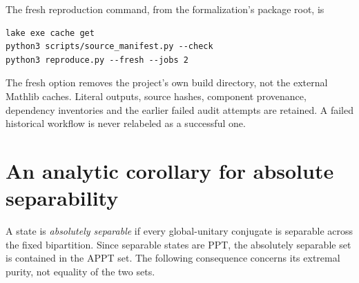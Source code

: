 \documentclass[11pt]{article}
\theoremstyle{remark}\newtheorem{remark}[theorem]{Remark}
\begin{document}
The fresh reproduction command, from the formalization's package root, is
\begin{verbatim}
lake exe cache get
python3 scripts/source_manifest.py --check
python3 reproduce.py --fresh --jobs 2
\end{verbatim}
The fresh option removes the project's own build directory, not the external Mathlib caches. Literal outputs, source hashes, component provenance, dependency inventories and the earlier failed audit attempts are retained. A failed historical workflow is never relabeled as a successful one.

\section{An analytic corollary for absolute separability}\label{sec:asep}
A state is \emph{absolutely separable} if every global-unitary conjugate is separable across the fixed bipartition. Since separable states are PPT, the absolutely separable set is contained in the APPT set. The following consequence concerns its extremal purity, not equality of the two sets.
\end{document}
